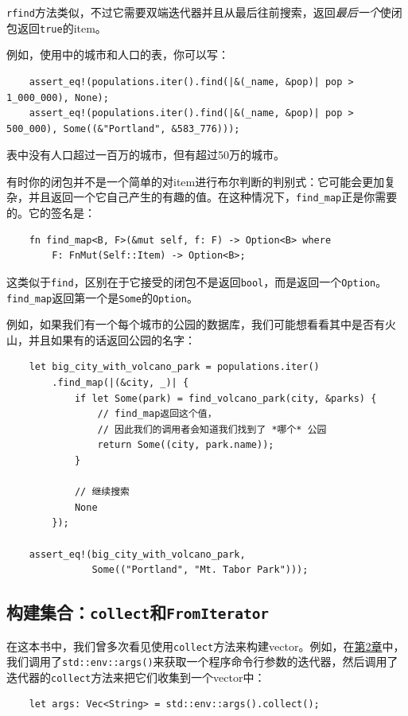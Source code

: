 \texttt{rfind}方法类似，不过它需要双端迭代器并且从最后往前搜索，返回\emph{最后一个}使闭包返回\texttt{true}的item。

例如，使用中的城市和人口的表，你可以写：
\begin{verbatim}
    assert_eq!(populations.iter().find(|&(_name, &pop)| pop > 1_000_000), None);
    assert_eq!(populations.iter().find(|&(_name, &pop)| pop > 500_000), Some((&"Portland", &583_776)));
\end{verbatim}

表中没有人口超过一百万的城市，但有超过50万的城市。

有时你的闭包并不是一个简单的对item进行布尔判断的判别式：它可能会更加复杂，并且返回一个它自己产生的有趣的值。在这种情况下，\texttt{find\_map}正是你需要的。它的签名是：
\begin{verbatim}
    fn find_map<B, F>(&mut self, f: F) -> Option<B> where
        F: FnMut(Self::Item) -> Option<B>;
\end{verbatim}

这类似于\texttt{find}，区别在于它接受的闭包不是返回\texttt{bool}，而是返回一个\texttt{Option}。\texttt{find\_map}返回第一个是\texttt{Some}的\texttt{Option}。

例如，如果我们有一个每个城市的公园的数据库，我们可能想看看其中是否有火山，并且如果有的话返回公园的名字：
\begin{verbatim}
    let big_city_with_volcano_park = populations.iter()
        .find_map(|(&city, _)| {
            if let Some(park) = find_volcano_park(city, &parks) {
                // find_map返回这个值，
                // 因此我们的调用者会知道我们找到了 *哪个* 公园
                return Some((city, park.name));
            }

            // 继续搜索
            None
        });

    assert_eq!(big_city_with_volcano_park,
               Some(("Portland", "Mt. Tabor Park")));
\end{verbatim}

\subsection{构建集合：\texttt{collect}和\texttt{FromIterator}}\label{BuildColl}
在这本书中，我们曾多次看见使用\texttt{collect}方法来构建vector。例如，在\hyperref[ch02]{第2章}中，我们调用了\texttt{std::env::args()}来获取一个程序命令行参数的迭代器，然后调用了迭代器的\texttt{collect}方法来把它们收集到一个vector中：
\begin{verbatim}
    let args: Vec<String> = std::env::args().collect();
\end{verbatim}

